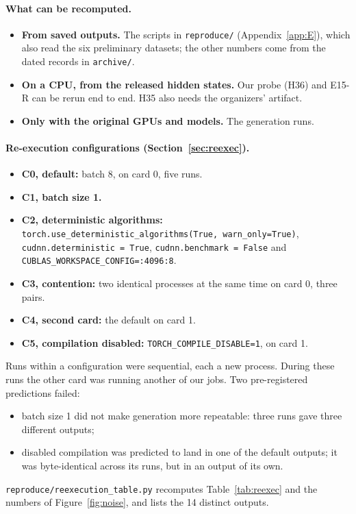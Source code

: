 \paragraph{What can be recomputed.}
\begin{itemize}
\item \textbf{From saved outputs.} The scripts in \texttt{reproduce/} (Appendix~\ref{app:E}), which also read the six preliminary datasets; the other numbers come from the dated records in \texttt{archive/}.
\item \textbf{On a CPU, from the released hidden states.} Our probe (H36) and E15-R can be rerun end to end. H35 also needs the organizers' artifact.
\item \textbf{Only with the original GPUs and models.} The generation runs.
\end{itemize}

\paragraph{Re-execution configurations (Section~\ref{sec:reexec}).}
\begin{itemize}
\item \textbf{C0, default:} batch 8, on card 0, five runs.
\item \textbf{C1, batch size 1.}
\item \textbf{C2, deterministic algorithms:} \texttt{torch.use\_deterministic\_algorithms(True, warn\_only=True)}, \texttt{cudnn.deterministic = True}, \texttt{cudnn.benchmark = False} and \texttt{CUBLAS\_WORKSPACE\_CONFIG=:4096:8}.
\item \textbf{C3, contention:} two identical processes at the same time on card 0, three pairs.
\item \textbf{C4, second card:} the default on card 1.
\item \textbf{C5, compilation disabled:} \texttt{TORCH\_COMPILE\_DISABLE=1}, on card 1.
\end{itemize}
Runs within a configuration were sequential, each a new process. During these runs the other card was running another of our jobs. Two pre-registered predictions failed:
\begin{itemize}
\item batch size 1 did not make generation more repeatable: three runs gave three different outputs;
\item disabled compilation was predicted to land in one of the default outputs; it was byte-identical across its runs, but in an output of its own.
\end{itemize}
\texttt{reproduce/reexecution\_table.py} recomputes Table~\ref{tab:reexec} and the numbers of Figure~\ref{fig:noise}, and lists the 14 distinct outputs.

